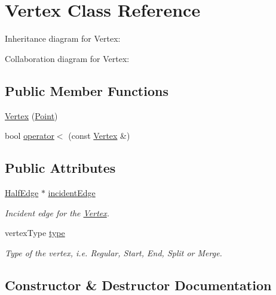 \hypertarget{classVertex}{}\section{Vertex Class Reference}
\label{classVertex}


Inheritance diagram for Vertex\+:


Collaboration diagram for Vertex\+:
\subsection*{Public Member Functions}
\begin{DoxyCompactItemize}
\item 
\hyperlink{classVertex_a5fd2325bfa0c5de8c7bc904e068a569c}{Vertex} (\hyperlink{classPoint}{Point})
\item 
bool \hyperlink{classVertex_a625610fd16b3db424ab78069a4994f48}{operator$<$} (const \hyperlink{classVertex}{Vertex} \&)
\end{DoxyCompactItemize}
\subsection*{Public Attributes}
\begin{DoxyCompactItemize}
\item 
\mbox{\label{classVertex_ad184af21e1f2e7fbd1d49099f3111b34}} 
\hyperlink{classHalfEdge}{Half\+Edge} $\ast$ \hyperlink{classVertex_ad184af21e1f2e7fbd1d49099f3111b34}{incident\+Edge}
\begin{DoxyCompactList}\small\item\em Incident edge for the \hyperlink{classVertex}{Vertex}. \end{DoxyCompactList}\item 
\mbox{\label{classVertex_a8f8bcebe027b0443acaee56ac67e2742}} 
vertex\+Type \hyperlink{classVertex_a8f8bcebe027b0443acaee56ac67e2742}{type}
\begin{DoxyCompactList}\small\item\em Type of the vertex, i.\+e. Regular, Start, End, Split or Merge. \end{DoxyCompactList}\end{DoxyCompactItemize}


\subsection{Constructor \& Destructor Documentation}
\mbox{\label{classVertex_a5fd2325bfa0c5de8c7bc904e068a569c}} 
